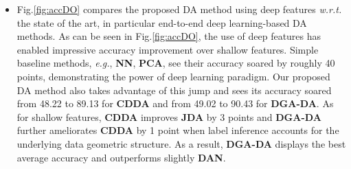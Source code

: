 \documentclass[journal,twocolumn]{IEEEtran}
\newcommand\luo[1]{{\footnotesize \color{blue}[#1 - \textbf{Luo}]}}
\begin{document}
\begin{CJK*}{UTF8}{gkai}
\begin{itemize}
\item Fig.\ref{fig:accDO} compares the proposed DA method using deep features \textit{w.r.t.}   the state of the art, in particular end-to-end deep learning-based DA methods. As can be seen in Fig.\ref{fig:accDO}, the use of deep features has enabled impressive accuracy improvement over shallow features. Simple baseline methods, \textit{e.g.}, \textbf{NN}, \textbf{PCA}, see their accuracy soared by roughly 40 points, demonstrating the power of deep learning paradigm. Our proposed DA method also takes advantage of this jump and sees its accuracy soared from 48.22 to 89.13 for \textbf{CDDA} and from 49.02 to 90.43 for \textbf{DGA-DA}. As for shallow features, \textbf{CDDA} improves \textbf{JDA} by 3 points and \textbf{DGA-DA} further ameliorates \textbf{CDDA} by 1 point when label inference accounts for the underlying data geometric structure. As a result, \textbf{DGA-DA} displays the best average accuracy and outperforms slightly \textbf{DAN}.   



\end{itemize}
\end{CJK*}
\end{document}
